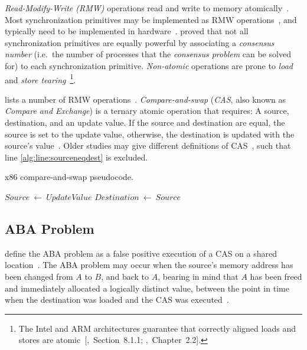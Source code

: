 \emph{Read-Modify-Write (RMW)} operations read and write to memory
atomically~\citep{perfbook2021}. Most synchronization primitives may be
implemented as RMW operations~\citep[Section~5.6]{herlihy2020art}, and
typically need to be implemented in hardware~\citep[Appendix~B.8]{herlihy2020art}.
\citeauthor{herlihy1991wait} proved that not all synchronization primitives are
equally powerful by associating a \emph{consensus number} (i.e.~the number of
processes that the \emph{consensus problem} can be solved for) to each
synchronization primitive. \emph{Non-atomic} operations are prone to \emph{load} and \emph{store
tearing}~\citep[Section~4.3.4]{perfbook2021}\footnote{The Intel and ARM
architectures guarantee that correctly aligned loads and stores are
atomic~[\citealp{intel2021system},~Section~8.1.1;
\citealp{arm2022architecture},~Chapter~2.2].}.

\citeauthor{scott2013shared} lists a number of RMW operations~\citep[Table~2.2]{scott2013shared}.
\emph{Compare-and-swap} (\emph{CAS}, also known as \emph{Compare and Exchange})
is a ternary atomic operation that requires: A source, destination, and an
update value. If the source and destination are equal, the source is set to the
update value, otherwise, the destination is updated with the source's
value~\citep{intel2021inst}.
Older studies may give different definitions of
CAS~\citetext{\citealp{scott2013shared},~Table~2.2;~\citealp{valois1995datastructures},Appendix~A}, such that line \ref{alg:line:sourceneqdest} is excluded.

\SetNoFillComment
{}
\begin{algorithm}[hbt!]
    \caption{x86 compare-and-swap pseudocode.}\label{alg:cas}
        {
            $Source~\gets~UpdateValue$
        }
        $Destination~\gets~Source$ \label{alg:line:sourceneqdest}
\end{algorithm}


\subsection{ABA Problem}
\citeauthor{dechev2010understanding} define the ABA problem as a false positive
execution of a CAS on a shared location~\citep{dechev2010understanding}. The ABA
problem may occur when the source's memory address has been changed from $A$ to
$B$, and back to $A$, bearing in mind that $A$ has been freed and immediately
allocated a logically distinct value, between the point in time when the
destination was loaded and the CAS was executed~\citep{dechev2010understanding}.

